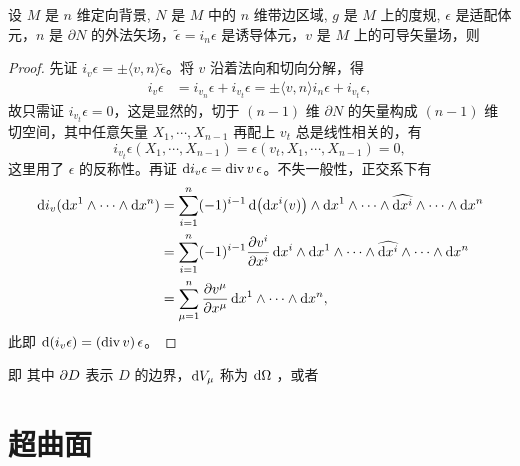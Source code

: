 \begin{theorem}[Gauss]
    设 $M$ 是 $n$ 维定向背景, $N$ 是 $M$ 中的 $n$ 维带边区域, $g$ 是 $M$ 上的度规, $\epsilon$ 是适配体元，$n$ 是 $\partial N$ 的外法矢场，$\tilde\epsilon=i_n \epsilon$ 是诱导体元，$v$ 是 $M$ 上的可导矢量场，则
\end{theorem}
\begin{proof}
    先证 $i_v\epsilon=\pm\langle v,n\rangle \tilde\epsilon$。将 $v$ 沿着法向和切向分解，得
    \begin{align*}
        i_v\epsilon&=i_{v_n}\epsilon+i_{v_t}\epsilon=\pm\langle v,n\rangle i_{n}\epsilon+i_{v_t}\epsilon,
    \end{align*}
    故只需证 $i_{v_t}\epsilon=0$，这是显然的，切于 $(n-1)$ 维 $\partial N$ 的矢量构成 $(n-1)$ 维切空间，其中任意矢量 $X_1,\cdots,X_{n-1}$ 再配上 $v_t$ 总是线性相关的，有
    \[
    i_{v_t}\epsilon(X_1,\cdots,X_{n-1})=\epsilon(v_t,X_1,\cdots,X_{n-1})=0,
    \]
    这里用了 $\epsilon$ 的反称性。再证 $\dd i_v\epsilon=\operatorname{div} v\,\epsilon$。不失一般性，正交系下有
    \begin{align*}
        \dd i_v(\dd x^1\wedge\cdots\wedge\dd x^n)&= \sum_{i=1}^n (-1)^{i-1} \dd(\dd x^i(v))\wedge\dd x^1 \wedge \cdots \wedge \widehat{\dd x^i}\wedge \cdots \wedge \dd x^n\\
        &=\sum_{i=1}^n (-1)^{i-1} \pdv{v^i}{x^i}\,\dd x^i\wedge\dd x^1 \wedge \cdots \wedge \widehat{\dd x^i}\wedge \cdots \wedge \dd x^n\\
        &=\sum_{\mu=1}^n\pdv{v^\mu}{x^\mu}\,\dd x^1\wedge\cdots\wedge\dd x^n,
    \end{align*}
    此即 $\dd(i_v\epsilon)=(\operatorname{div} v)\,\epsilon$。
\end{proof}


即
其中 $\partial D$ 表示 $D$ 的边界，$\dd V_\mu$ 称为 $\dd{\Omega}$ ，或者




\section{超曲面}


